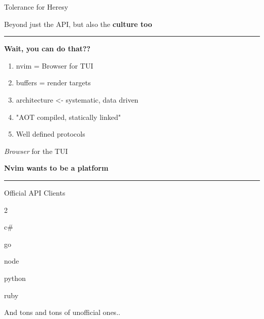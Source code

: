 \documentclass{beamer}
\begin{document}
\begin{frame}{Tolerance for Heresy}

	Beyond just the API, but also the \textbf{culture too}

	\rule{\textwidth}{0.1em}

	\textbf{Wait, you can do that??}

	\begin{enumerate}

		\item nvim = Browser for TUI

		\item buffers = render targets

		\item architecture <- systematic, data driven

		\item "AOT compiled, statically linked"

		\item Well defined protocols

	\end{enumerate}

\end{frame}


\begin{frame}{\textit{Browser} for the TUI}

	\textbf{Nvim wants to be a platform}

	\rule{\textwidth}{0.1em}

	\hspace{0.1em}

	\begin{block}{Official API Clients}

		\begin{itemize}


		\end{itemize}

	\end{block}

	And tons and tons of unofficial ones..

\end{frame}
\end{document}
